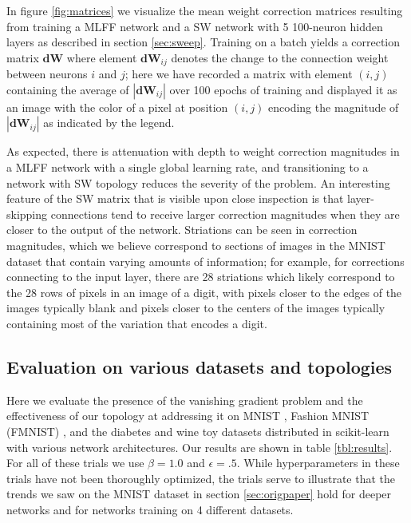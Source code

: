 \documentclass[utf8]{frontiersSCNS}
\begin{document}
In figure \ref{fig:matrices} we visualize the mean weight correction matrices resulting from training a MLFF network and a SW network with 5 100-neuron hidden layers as described in section \ref{sec:sweep}. Training on a batch yields a correction matrix $\mathbf{dW}$ where element $\mathbf{dW}_{ij}$ denotes the change to the connection weight between neurons $i$ and $j$; here we have recorded a matrix with element $(i, j)$ containing the average of $|\mathbf{dW}_{ij}|$ over 100 epochs of training and displayed it as an image with the color of a pixel at position $(i, j)$ encoding the magnitude of $|\mathbf{dW}_{ij}|$ as indicated by the legend.

As expected, there is attenuation with depth to weight correction magnitudes in a MLFF network with a single global learning rate, and transitioning to a network with SW topology reduces the severity of the problem. An interesting feature of the SW matrix that is visible upon close inspection is that layer-skipping connections tend to receive larger correction magnitudes when they are closer to the output of the network. Striations can be seen in correction magnitudes, which we believe correspond to sections of images in the MNIST dataset that contain varying amounts of information; for example, for corrections connecting to the input layer, there are 28 striations which likely correspond to the 28 rows of pixels in an image of a digit, with pixels closer to the edges of the images typically blank and pixels closer to the centers of the images typically containing most of the variation that encodes a digit.

\subsection{Evaluation on various datasets and topologies}
\label{sec:comparison}

Here we evaluate the presence of the vanishing gradient problem and the effectiveness of our topology at addressing it on MNIST \citep{mnist1998}, Fashion MNIST (FMNIST) \citep{fmnist2017}, and the diabetes and wine toy datasets distributed in scikit-learn \citep{sklearn2011} with various network architectures. Our results are shown in table \ref{tbl:results}. For all of these trials we use $\beta=1.0$ and $\epsilon=.5$. While hyperparameters in these trials have not been thoroughly optimized, the trials serve to illustrate that the trends we saw on the MNIST dataset in section \ref{sec:origpaper} hold for deeper networks and for networks training on 4 different datasets.
\end{document}

